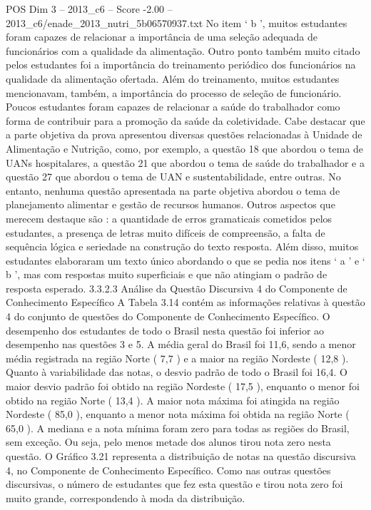 \begin{textsample}{POS Dim 3 – 2013\_c6 – Score -2.00 – 2013\_c6/enade\_2013\_nutri\_5b06570937.txt}
No item ‘ b ’, muitos estudantes foram capazes de relacionar a importância de uma seleção adequada de funcionários com a qualidade da alimentação.
Outro ponto também muito citado pelos estudantes foi a importância do treinamento periódico dos funcionários na qualidade da alimentação ofertada.
Além do treinamento, muitos estudantes mencionavam, também, a importância do processo de seleção de funcionário.
Poucos estudantes foram capazes de relacionar a saúde do trabalhador como forma de contribuir para a promoção da saúde da coletividade.
Cabe destacar que a parte objetiva da prova apresentou diversas questões relacionadas à Unidade de Alimentação e Nutrição, como, por exemplo, a questão 18 que abordou o tema de UANs hospitalares, a questão 21 que abordou o tema de saúde do trabalhador e a questão 27 que abordou o tema de UAN e sustentabilidade, entre outras.
No entanto, nenhuma questão apresentada na parte objetiva abordou o tema de planejamento alimentar e gestão de recursos humanos.
Outros aspectos que merecem destaque são : a quantidade de erros gramaticais cometidos pelos estudantes, a presença de letras muito difíceis de compreensão, a falta de sequência lógica e seriedade na construção do texto resposta.
Além disso, muitos estudantes elaboraram um texto único abordando o que se pedia nos itens ‘ a ’ e ‘ b ’, mas com respostas muito superficiais e que não atingiam o padrão de resposta esperado. 3.3.2.3 Análise da Questão Discursiva 4 do Componente de Conhecimento Específico A Tabela 3.14 contém as informações relativas à questão 4 do conjunto de questões do Componente de Conhecimento Específico.
O desempenho dos estudantes de todo o Brasil nesta questão foi inferior ao desempenho nas questões 3 e 5.
A média geral do Brasil foi 11,6, sendo a menor média registrada na região Norte ( 7,7 ) e a maior na região Nordeste ( 12,8 ).
Quanto à variabilidade das notas, o desvio padrão de todo o Brasil foi 16,4.
O maior desvio padrão foi obtido na região Nordeste ( 17,5 ), enquanto o menor foi obtido na região Norte ( 13,4 ).
A maior nota máxima foi atingida na região Nordeste ( 85,0 ), enquanto a menor nota máxima foi obtida na região Norte ( 65,0 ).
A mediana e a nota mínima foram zero para todas as regiões do Brasil, sem exceção.
Ou seja, pelo menos metade dos alunos tirou nota zero nesta questão.
O Gráfico 3.21 representa a distribuição de notas na questão discursiva 4, no Componente de Conhecimento Específico.
Como nas outras questões discursivas, o número de estudantes que fez esta questão e tirou nota zero foi muito grande, correspondendo à moda da distribuição.

\end{textsample}

